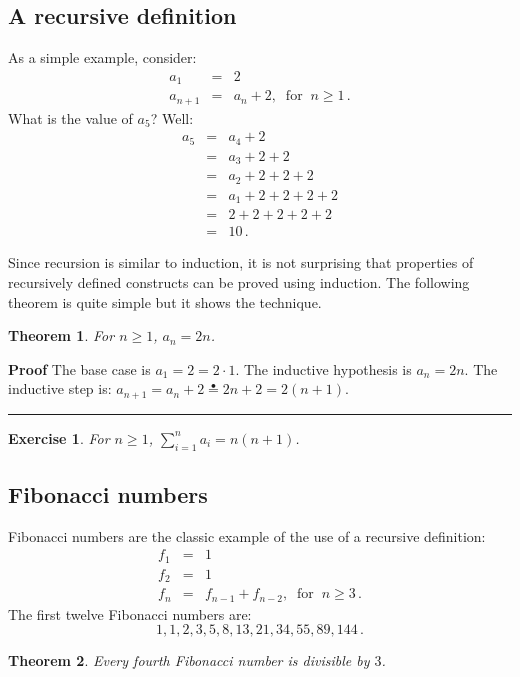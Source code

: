 \documentclass[11pt,a4paper]{report}
\newcommand*{\ih}{\stackrel{\bullet}{=}}
\newcommand*{\qed}{\hfill\rule{1ex}{1.5ex}}
\newtheorem{theorem}{Theorem}
\newtheorem{exercise}{Exercise}
\begin{document}
\subsection*{A recursive definition}

As a simple example, consider:
\begin{eqnarray*}
a_1 &=& 2\\
a_{n+1} &=& a_n + 2, \;\;\textrm{for}\;\; n\geq 1\,.
\end{eqnarray*}
What is the value of $a_5$? Well:
\begin{eqnarray*}
a_5 &=& a_4 + 2\\
&=& a_3+2+2\\
&=& a_2+2+2+2\\
&=& a_1+2+2+2+2\\
&=& 2+2+2+2+2\\
&=&10\,.
\end{eqnarray*}

Since recursion is similar to induction, it is not surprising that properties of recursively defined constructs can be proved using induction. The following theorem is quite simple but it shows the technique.

\begin{theorem}\label{t.recursive}
For $n\geq 1$, $a_n = 2n$.
\end{theorem}

\textbf{Proof} The base case is $a_1=2=2\cdot 1$. The inductive hypothesis is $a_n = 2n$. The inductive step is: $a_{n+1} = a_n + 2 \ih{} 2n + 2 = 2(n+1)$.\qed

\begin{exercise}
For $n\geq 1$, $\sum_{i=1}^n a_i = n(n+1)$.
\end{exercise}

\subsection*{Fibonacci numbers}

Fibonacci numbers are the classic example of the use of a recursive definition:
\begin{eqnarray*}
f_1 &=& 1\\
f_2 &=& 1\\
f_n &=& f_{n-1} + f_{n-2}, \;\; \textrm{for} \;\; n \geq 3\,.
\end{eqnarray*}
The first twelve Fibonacci numbers are:
\[
1, 1, 2, 3, 5, 8, 13, 21, 34, 55, 89, 144\,.
\]

\begin{theorem}
Every fourth Fibonacci number is divisible by $3$.
\end{theorem}
\end{document}
